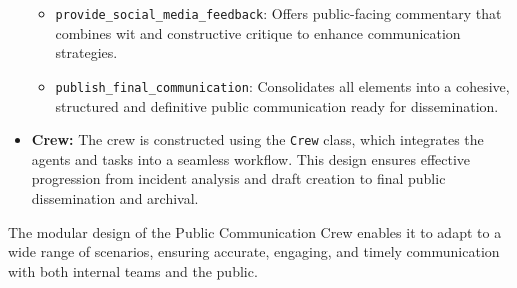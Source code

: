\begin{itemize}
\begin{itemize}
        \item \texttt{provide\_social\_media\_feedback}: Offers public-facing commentary that combines wit and constructive critique to enhance communication strategies.
        \item \texttt{publish\_final\_communication}: Consolidates all elements into a cohesive, structured and definitive public communication ready for dissemination.
    \end{itemize}
    \item \textbf{Crew:}
    The crew is constructed using the \texttt{Crew} class, which integrates the agents and tasks into a seamless workflow. This design ensures effective progression from incident analysis and draft creation to final public dissemination and archival.
\end{itemize}
The modular design of the Public Communication Crew enables it to adapt to a wide range of scenarios, ensuring accurate, engaging, and timely communication with both internal teams and the public.
